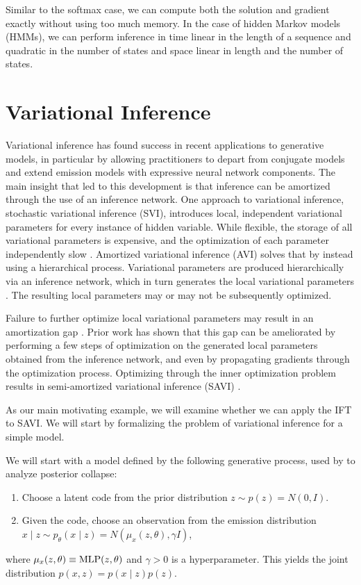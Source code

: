 \documentclass[11pt]{article}
\begin{document}
Similar to the softmax case, we can compute both the solution and gradient
exactly without using too much memory.
In the case of hidden Markov models (HMMs), we can perform inference in time linear
in the length of a sequence and quadratic in the number of states and
space linear in length and the number of states.



\section{Variational Inference}
Variational inference has found success in recent applications to generative models,
in particular by allowing practitioners to depart from conjugate models
and extend emission models with expressive neural network components.
The main insight that led to this development is that inference can be amortized through
the use of an inference network.
One approach to variational inference, stochastic variational inference (SVI),
introduces local, independent variational parameters for every instance of hidden variable.
While flexible, the storage of all variational parameters is expensive, and the optimization
of each parameter independently slow \citep{}.
Amortized variational inference (AVI) solves that by instead using a hierarchical process.
Variational parameters are produced hierarchically via an inference network,
which in turn generates the local variational parameters \citep{}.
The resulting local parameters may or may not be subsequently optimized.

Failure to further optimize local variational parameters may result in an amortization gap \citep{}.
Prior work has shown that this gap can be ameliorated by performing a few steps of
optimization on the generated local parameters obtained from the inference network,
and even by propagating gradients through the optimization process.
Optimizing through the inner optimization problem results in semi-amortized variational inference
(SAVI) \citep{}.

As our main motivating example, we will examine whether we can apply the IFT to SAVI.
We will start by formalizing the problem of variational inference for a simple model.

We will start with a model defined by the following generative process,
used by \citet{dai2020vae} to analyze posterior collapse:
\begin{enumerate}
\item Choose a latent code from the prior distribution $z \sim p(z) = N(0, I)$.
\item Given the code, choose an observation from the emission distribution
    $x \mid z \sim p_\theta(x \mid z) = N(\mu_x(z, \theta), \gamma I)$,
\end{enumerate}
where $\mu_x(z, \theta) \equiv \mathrm{MLP}(z, \theta)$ and $\gamma > 0$ is a hyperparameter.
This yields the joint distribution $p(x,z) = p(x\mid z)p(z)$.
\end{document}
